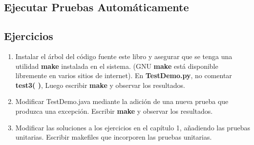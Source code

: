 \newpage

\subsection*{Ejecutar Pruebas Automáticamente}
\label{subsec:epa}


\subsection*{Ejercicios}
\label{subsec:ex}

\begin{enumerate}
    
    \item Instalar el árbol del código fuente este libro y asegurar que se tenga una utilidad \textbf{make} instalada en el sistema. (GNU \textbf{make} está disponible libremente en varios sitios de internet). En \textbf{TestDemo.py}, no comentar \textbf{test3( )}, Luego  escribir \textbf{make} y observar los resultados.
    
    \item Modificar TestDemo.java mediante la adición de una nueva prueba que produzca una excepción. Escribir \textbf{make} y observar los resultados.
    
    \item Modificar las soluciones a los ejercicios en el capítulo 1, añadiendo las pruebas unitarias. Escribir makefiles que incorporen las pruebas unitarias.
    
\end{enumerate}

            
